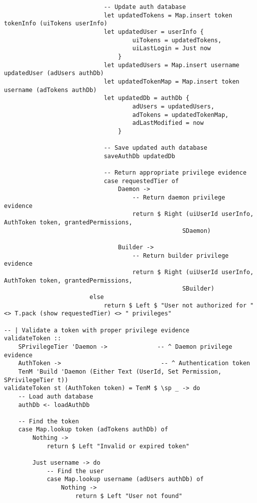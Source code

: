 \documentclass{article}
\begin{document}
\begin{tcolorbox}[title=Ten/Daemon/Auth.hs Changes]
\begin{verbatim}
                            -- Update auth database
                            let updatedTokens = Map.insert token tokenInfo (uiTokens userInfo)
                            let updatedUser = userInfo {
                                    uiTokens = updatedTokens,
                                    uiLastLogin = Just now
                                }
                            let updatedUsers = Map.insert username updatedUser (adUsers authDb)
                            let updatedTokenMap = Map.insert token username (adTokens authDb)
                            let updatedDb = authDb {
                                    adUsers = updatedUsers,
                                    adTokens = updatedTokenMap,
                                    adLastModified = now
                                }

                            -- Save updated auth database
                            saveAuthDb updatedDb

                            -- Return appropriate privilege evidence
                            case requestedTier of
                                Daemon ->
                                    -- Return daemon privilege evidence
                                    return $ Right (uiUserId userInfo, AuthToken token, grantedPermissions,
                                                  SDaemon)

                                Builder ->
                                    -- Return builder privilege evidence
                                    return $ Right (uiUserId userInfo, AuthToken token, grantedPermissions,
                                                  SBuilder)
                        else
                            return $ Left $ "User not authorized for " <> T.pack (show requestedTier) <> " privileges"

-- | Validate a token with proper privilege evidence
validateToken ::
    SPrivilegeTier 'Daemon ->              -- ^ Daemon privilege evidence
    AuthToken ->                            -- ^ Authentication token
    TenM 'Build 'Daemon (Either Text (UserId, Set Permission, SPrivilegeTier t))
validateToken st (AuthToken token) = TenM $ \sp _ -> do
    -- Load auth database
    authDb <- loadAuthDb

    -- Find the token
    case Map.lookup token (adTokens authDb) of
        Nothing ->
            return $ Left "Invalid or expired token"

        Just username -> do
            -- Find the user
            case Map.lookup username (adUsers authDb) of
                Nothing ->
                    return $ Left "User not found"


\end{verbatim}
\end{tcolorbox}
\end{document}
